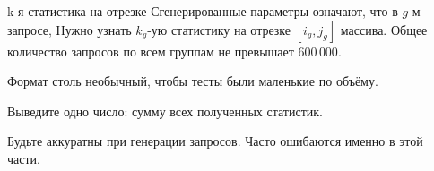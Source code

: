 \begin{problem}{k-я статистика на отрезке}
Сгенерированные параметры означают, что в $g$-м запросе,
Нужно узнать $k_g$-ую статистику на отрезке $[i_g, j_g]$ массива.
Общее количество запросов по всем группам не превышает $600\,000$.

Формат столь необычный, чтобы тесты были маленькие по объёму.

\OutputFile

Выведите одно число: сумму всех полученных статистик.

\Example

\begin{example}
%
\end{example}

\medskip

\Note

Будьте аккуратны при генерации запросов. Часто ошибаются именно в этой части.




\end{problem}
